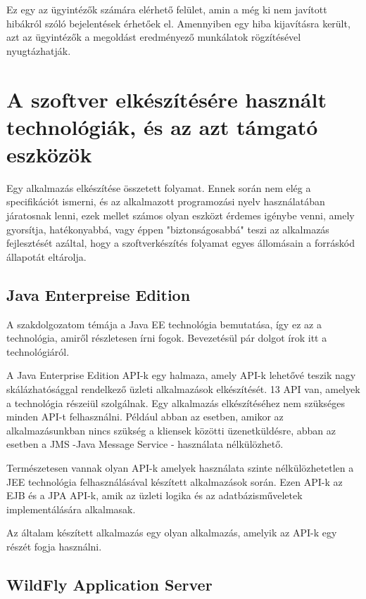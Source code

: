 \documentclass[centeredchapter]{thesis-ekf}
\theoremstyle{definition}
\theoremstyle{remark}
\begin{document}
Ez egy az ügyintézők számára elérhető felület, amin a még ki nem javított hibákról szóló bejelentések érhetőek el. Amennyiben egy hiba kijavításra került, azt az ügyintézők a megoldást eredményező munkálatok rögzítésével nyugtázhatják.

\section{A szoftver elkészítésére használt technológiák, és az azt támgató eszközök}

Egy alkalmazás elkészítése összetett folyamat. Ennek során nem elég a specifikációt ismerni, és az alkalmazott programozási nyelv használatában járatosnak lenni, ezek mellet számos olyan eszközt érdemes igénybe venni, amely gyorsítja, hatékonyabbá, vagy éppen "biztonságosabbá" teszi az alkalmazás fejlesztését azáltal, hogy a szoftverkészítés folyamat egyes állomásain a forráskód állapotát eltárolja.

\subsection{Java Enterpreise Edition}

A szakdolgozatom témája a Java EE technológia bemutatása, így ez az a technológia, amiről részletesen írni fogok. Bevezetésül pár dolgot írok itt a technológiáról.

A Java Enterprise Edition API-k egy halmaza, amely API-k lehetővé teszik nagy skálázhatósággal rendelkező üzleti alkalmazások elkészítését. 13 API van, amelyek a technológia részeiül szolgálnak.
Egy alkalmazás elkészítéséhez nem szükséges minden API-t felhasználni. Például abban az esetben, amikor az alkalmazásunkban nincs szükség a kliensek közötti üzenetküldésre, abban az esetben a JMS -Java Message Service - használata nélkülözhető.

Természetesen vannak olyan API-k amelyek használata szinte nélkülözhetetlen a JEE technológia felhasználásával készített alkalmazások során. Ezen API-k az EJB és a JPA API-k, amik az üzleti logika és az adatbázisműveletek implementálására alkalmasak.

Az általam készített alkalmazás egy olyan alkalmazás, amelyik az API-k egy részét fogja használni.

\subsection{WildFly Application Server}
\end{document}
